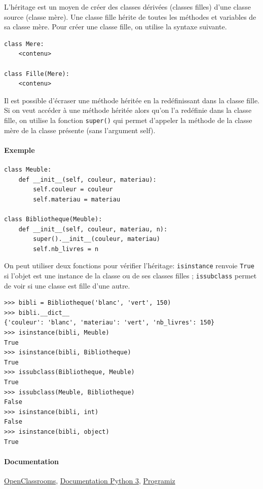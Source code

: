 \documentclass[a4paper, 10pt]{article}
\newcommand{\code}[1]{{\small\texttt{#1}}}
\begin{document}
L'héritage est un moyen de créer des classes dérivées (classes filles) d'une classe source (classe mère). Une classe fille hérite de toutes les méthodes et variables de sa classe mère. Pour créer une classe fille, on utilise la syntaxe suivante.

\begin{verbatim}
class Mere:
    <contenu>

class Fille(Mere):
    <contenu>
\end{verbatim}

Il est possible d'écraser une méthode héritée en la redéfinissant dans la classe fille. Si on veut accéder à une méthode héritée alors qu'on l'a redéfinie dans la classe fille, on utilise la fonction \code{super()} qui permet d'appeler la méthode de la classe mère de la classe présente (sans l'argument self). 

\paragraph{Exemple}
\begin{verbatim}
class Meuble:
    def __init__(self, couleur, materiau):
        self.couleur = couleur
        self.materiau = materiau

class Bibliotheque(Meuble):
    def __init__(self, couleur, materiau, n):
        super().__init__(couleur, materiau)
        self.nb_livres = n
\end{verbatim}
On peut utiliser deux fonctions pour vérifier l'héritage: \code{isinstance} renvoie \code{True} si l'objet est une instance de la classe ou de ses classes filles ; \code{issubclass} permet de voir si une classe est fille d'une autre.   

\begin{Verbatim}[frame = single, fontsize = \footnotesize]
>>> bibli = Bibliotheque('blanc', 'vert', 150)
>>> bibli.__dict__
{'couleur': 'blanc', 'materiau': 'vert', 'nb_livres': 150}
>>> isinstance(bibli, Meuble)
True
>>> isinstance(bibli, Bibliotheque)
True
>>> issubclass(Bibliotheque, Meuble)
True
>>> issubclass(Meuble, Bibliotheque)
False
>>> isinstance(bibli, int)
False
>>> isinstance(bibli, object)
True
\end{Verbatim}

\paragraph{Documentation} \href{https://openclassrooms.com/courses/apprenez-a-programmer-en-python/l-heritage-9}{OpenClassrooms}, \href{https://docs.python.org/fr/3/tutorial/classes.html?highlight=héritage#inheritance}{Documentation Python 3}, \href{https://www.programiz.com/python-programming/inheritance}{Programiz}
\end{document}
